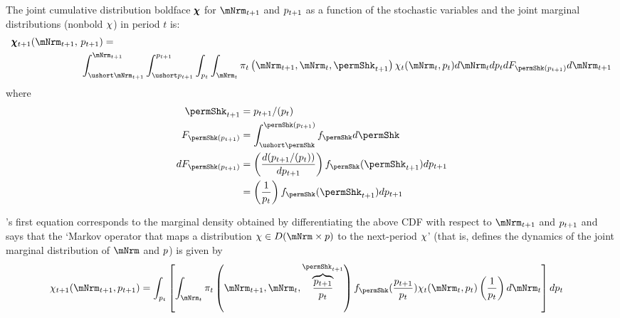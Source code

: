 \documentclass[\econtexRoot/BufferStockTheory]{subfiles}
\begin{document}
The joint cumulative distribution boldface $\pmb{\chi}$ for $\mNrmNxt$ and $p_{t+1}$ as a function of the stochastic variables and the joint marginal distributions (nonbold $\chi$) in period $t$ is:
\begin{equation}
  \begin{aligned} \label{eq:MeasTrnstCDF}
  \pmb{\mpPrb}_{t+1}(\mNrmNxt,~& \PermLvlPrbNxt) =  \\ &
                                          \int_{\mNrmNxtBot}^{\mNrmNxt}
                                          \int_{\PermLvlPrbNxtBot}^{\PermLvlPrbNxt}
                                          \int_{\PermLvlPrbNow} 
                                          \int_{\mNrmNow} \lomdkPrb_{t}\left(\mNrmNxt,\mNrmNow,\permShkPrbNxt\right)\mpPrb_{t}(\mNrmNow,\PermLvlPrbNow)  d \mNrmNow                                                                                     d \PermLvlPrbNow
                                                d F_{\permShk(\PermLvlPrbNxt)}
                                                d \mNrmNxt \notag
\end{aligned}\end{equation}
where 
\begin{align*}
  \permShkPrbNxt & = \PermLvlPrbNxt/(\PermGroFac \PermLvlPrbNow) 
\\    F_{\permShk(\PermLvlPrbNxt)} & = \int_{\permShkPrbBot}^{\permShk(\PermLvlPrbNxt)} f_{\permShk} d\permShk
    \\ dF_{\permShk(\PermLvlPrbNxt)} & = \left(\frac{d (\PermLvlPrbNxt/(\PermGroFac \PermLvlPrbNow))}{d\PermLvlPrbNxt}
                             \right)f_{\permShk}(\permShkPrbNxt) d \PermLvlPrbNxt 
\\ & = \left(\frac{1}{\PermGroFac \PermLvlPrbNow}                             \right)f_{\permShk}(\permShkPrbNxt) d \PermLvlPrbNxt 
  \end{align*}

\cite{harmenbergInvariant}'s first equation corresponds to the marginal density obtained by differentiating the above CDF with respect to $\mNrmNxt$ and $p_{t+1}$ and says that the `Markov operator that maps a distribution $\mpPrb \in D(\mNrm \times \PermLvlPrb)$ to the next-period $\chi$' (that is, defines the dynamics of the joint marginal distribution of $\mNrm$ and $p$) is given by
\begin{align} \label{eq:MeasTrnst}
\mpPrb_{t+1}(\mNrmNxt,\PermLvlPrbNxt) & =
                                          \int_{\PermLvlPrbNow} \left[
                                           \int_{\mNrmNow} \lomdkPrb_{t}\left(\mNrmNxt,\mNrmNow,
                                           \overbrace{\frac{\PermLvlPrbNxt}{\PermGroFac \PermLvlPrbNow}}^{\permShkPrbNxt}\right)\permShkRawPrb(\frac{\PermLvlPrbNxt}{\PermGroFac \PermLvlPrbNow})\mpPrb_{t}(\mNrmNow,\PermLvlPrbNow)\left(\frac{1}{\PermGroFac \PermLvlPrbNow}\right)  d \mNrmNow
                                          \right] d \PermLvlPrbNow
\end{align}
\newcommand{\nPermShk}{\texttt{i}}\newcommand{\nmNrmVecNow}{\texttt{j}}\newcommand{\nmNrmVecNxt}{\texttt{k}}\newcommand{\nPermLvlNow}{\texttt{n}}\newcommand{\nPermLvlNxt}{\texttt{q}}
\end{document}
